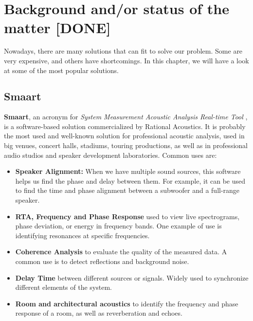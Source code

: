 \chapter{Background and/or status of the matter [DONE]}

Nowadays, there are many solutions that can fit to solve our problem. Some are very expensive, and others have shortcomings. In this chapter, we will have a look at some of the most popular solutions.

\section{Smaart}

\textbf{Smaart}, an acronym for \textit{System Measurement Acoustic Analysis Real-time Tool} \cite{SMAART}, is a software-based solution commercialized by Rational Acoustics. It is probably the most used and well-known solution for professional acoustic analysis, used in big venues, concert halls, stadiums, touring productions, as well as in professional audio studios and speaker development laboratories.  Common uses are:


\begin{itemize}
	\item \textbf{Speaker Alignment:} When we have multiple sound sources, this software helps us find the phase and delay between them. For example, it can be used to find the time and phase alignment between a subwoofer and a full-range speaker.
	
	\item \textbf{RTA, Frequency and Phase Response} used to view live spectrograms, phase deviation, or energy in frequency bands. One example of use is identifying resonances at specific frequencies.

	\item \textbf{Coherence Analysis} to evaluate the quality of the measured data. A common use is to detect reflections and background noise.
	
	\item \textbf{Delay Time} between different sources or signals. Widely used to synchronize different elements of the system.
	
	\item \textbf{Room and architectural acoustics} to identify the frequency and phase response of a room, as well as reverberation and echoes.
\end{itemize}
	
